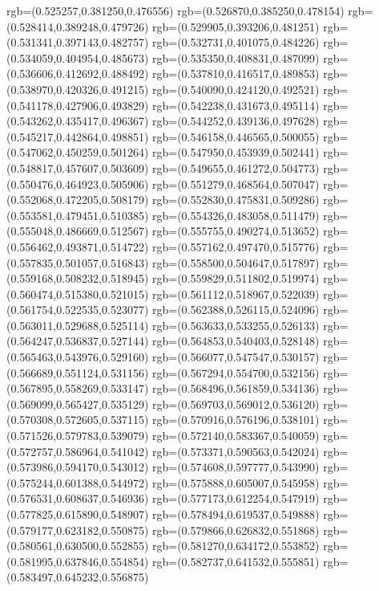 {{{			rgb=(0.525257,0.381250,0.476556)
			rgb=(0.526870,0.385250,0.478154)
			rgb=(0.528414,0.389248,0.479726)
			rgb=(0.529905,0.393206,0.481251)
			rgb=(0.531341,0.397143,0.482757)
			rgb=(0.532731,0.401075,0.484226)
			rgb=(0.534059,0.404954,0.485673)
			rgb=(0.535350,0.408831,0.487099)
			rgb=(0.536606,0.412692,0.488492)
			rgb=(0.537810,0.416517,0.489853)
			rgb=(0.538970,0.420326,0.491215)
			rgb=(0.540090,0.424120,0.492521)
			rgb=(0.541178,0.427906,0.493829)
			rgb=(0.542238,0.431673,0.495114)
			rgb=(0.543262,0.435417,0.496367)
			rgb=(0.544252,0.439136,0.497628)
			rgb=(0.545217,0.442864,0.498851)
			rgb=(0.546158,0.446565,0.500055)
			rgb=(0.547062,0.450259,0.501264)
			rgb=(0.547950,0.453939,0.502441)
			rgb=(0.548817,0.457607,0.503609)
			rgb=(0.549655,0.461272,0.504773)
			rgb=(0.550476,0.464923,0.505906)
			rgb=(0.551279,0.468564,0.507047)
			rgb=(0.552068,0.472205,0.508179)
			rgb=(0.552830,0.475831,0.509286)
			rgb=(0.553581,0.479451,0.510385)
			rgb=(0.554326,0.483058,0.511479)
			rgb=(0.555048,0.486669,0.512567)
			rgb=(0.555755,0.490274,0.513652)
			rgb=(0.556462,0.493871,0.514722)
			rgb=(0.557162,0.497470,0.515776)
			rgb=(0.557835,0.501057,0.516843)
			rgb=(0.558500,0.504647,0.517897)
			rgb=(0.559168,0.508232,0.518945)
			rgb=(0.559829,0.511802,0.519974)
			rgb=(0.560474,0.515380,0.521015)
			rgb=(0.561112,0.518967,0.522039)
			rgb=(0.561754,0.522535,0.523077)
			rgb=(0.562388,0.526115,0.524096)
			rgb=(0.563011,0.529688,0.525114)
			rgb=(0.563633,0.533255,0.526133)
			rgb=(0.564247,0.536837,0.527144)
			rgb=(0.564853,0.540403,0.528148)
			rgb=(0.565463,0.543976,0.529160)
			rgb=(0.566077,0.547547,0.530157)
			rgb=(0.566689,0.551124,0.531156)
			rgb=(0.567294,0.554700,0.532156)
			rgb=(0.567895,0.558269,0.533147)
			rgb=(0.568496,0.561859,0.534136)
			rgb=(0.569099,0.565427,0.535129)
			rgb=(0.569703,0.569012,0.536120)
			rgb=(0.570308,0.572605,0.537115)
			rgb=(0.570916,0.576196,0.538101)
			rgb=(0.571526,0.579783,0.539079)
			rgb=(0.572140,0.583367,0.540059)
			rgb=(0.572757,0.586964,0.541042)
			rgb=(0.573371,0.590563,0.542024)
			rgb=(0.573986,0.594170,0.543012)
			rgb=(0.574608,0.597777,0.543990)
			rgb=(0.575244,0.601388,0.544972)
			rgb=(0.575888,0.605007,0.545958)
			rgb=(0.576531,0.608637,0.546936)
			rgb=(0.577173,0.612254,0.547919)
			rgb=(0.577825,0.615890,0.548907)
			rgb=(0.578494,0.619537,0.549888)
			rgb=(0.579177,0.623182,0.550875)
			rgb=(0.579866,0.626832,0.551868)
			rgb=(0.580561,0.630500,0.552855)
			rgb=(0.581270,0.634172,0.553852)
			rgb=(0.581995,0.637846,0.554854)
			rgb=(0.582737,0.641532,0.555851)
			rgb=(0.583497,0.645232,0.556875)
}}}
